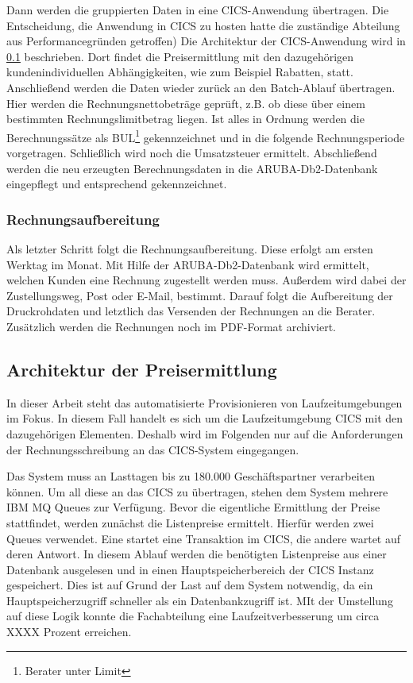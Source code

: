 Dann werden die gruppierten Daten in eine CICS-Anwendung übertragen. Die Entscheidung, die Anwendung in CICS zu hosten hatte die zuständige Abteilung aus Performancegründen getroffen) 
Die Architektur  der CICS-Anwendung wird in \ref{rechArch} beschrieben.
Dort findet die Preisermittlung mit den dazugehörigen kundenindividuellen Abhängigkeiten, wie zum Beispiel Rabatten, statt.
Anschließend werden die Daten wieder zurück an den Batch-Ablauf übertragen.
Hier werden die Rechnungsnettobeträge geprüft, z.B. ob diese über einem bestimmten Rechnungslimitbetrag liegen.
Ist alles in Ordnung werden die Berechnungssätze als BUL\footnote{Berater unter Limit} gekennzeichnet und in die folgende Rechnungsperiode vorgetragen.
Schließlich wird noch die Umsatzsteuer ermittelt.
Abschließend werden die neu erzeugten Berechnungsdaten in die ARUBA-Db2-Datenbank eingepflegt und entsprechend gekennzeichnet.

\subsubsection{Rechnungsaufbereitung}
Als letzter Schritt folgt die Rechnungsaufbereitung.
Diese erfolgt am ersten Werktag im Monat.
Mit Hilfe der ARUBA-Db2-Datenbank wird ermittelt, welchen Kunden eine Rechnung zugestellt werden muss.
Außerdem wird dabei der Zustellungsweg, Post oder E-Mail, bestimmt.
Darauf folgt die Aufbereitung der Druckrohdaten und letztlich das Versenden der Rechnungen an die Berater.
Zusätzlich werden die Rechnungen noch im PDF-Format archiviert.

\subsection{Architektur der Preisermittlung}\label{rechArch}
In dieser Arbeit steht das automatisierte Provisionieren von Laufzeitumgebungen im Fokus.
In diesem Fall handelt es sich um die Laufzeitumgebung CICS mit den dazugehörigen Elementen.
Deshalb wird im Folgenden nur auf die Anforderungen der Rechnungsschreibung an das CICS-System eingegangen.

Das System muss an Lasttagen bis zu 180.000 Geschäftspartner verarbeiten können.
Um all diese an das CICS zu übertragen, stehen dem System mehrere IBM MQ Queues zur Verfügung.
Bevor die eigentliche Ermittlung der Preise stattfindet, werden zunächst die Listenpreise ermittelt.
Hierfür werden zwei Queues verwendet.
Eine startet eine Transaktion im CICS, die andere wartet auf deren Antwort.
In diesem Ablauf werden die benötigten Listenpreise aus einer Datenbank ausgelesen und in einen Hauptspeicherbereich der CICS Instanz gespeichert.
Dies ist auf Grund der Last auf dem System notwendig, da ein Hauptspeicherzugriff schneller als ein Datenbankzugriff ist.
MIt der  Umstellung auf diese Logik konnte die Fachabteilung eine Laufzeitverbesserung um circa XXXX Prozent erreichen.

